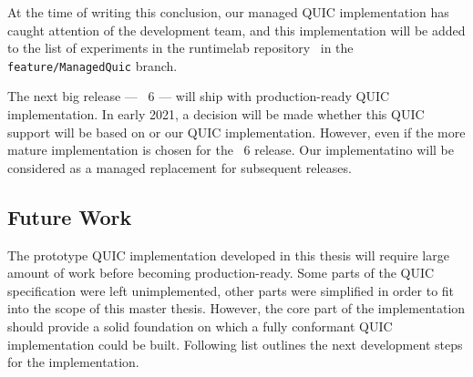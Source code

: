 At the time of writing this conclusion, our managed QUIC implementation has caught attention of the
\dotnet{} development team, and this implementation will be added to the list of experiments in the
runtimelab repository~\cite{runtimelabGithub} in the \texttt{feature/ManagedQuic} branch.

The next big release --- \dotnet{}~6 --- will ship with production-ready QUIC implementation. In early
2021, a decision will be made whether this QUIC support will be based on \libmsquic{} or our QUIC
implementation. However, even if the more mature \libmsquic{} implementation is chosen for the
\dotnet{}~6 release. Our implementatino will be considered as a managed replacement for subsequent
\dotnet{} releases.

\subsection*{Future Work}

The prototype QUIC implementation developed in this thesis will require large amount of work before
becoming production-ready. Some parts of the QUIC specification were left unimplemented, other parts
were simplified in order to fit into the scope of this master thesis. However, the core part of the
implementation should provide a solid foundation on which a fully conformant QUIC implementation
could be built. Following list outlines the next development steps for the implementation.

